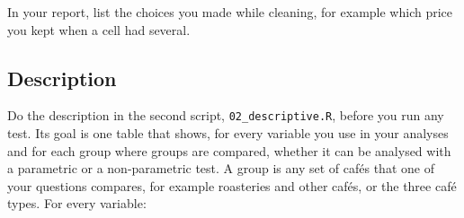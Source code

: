 \documentclass[11pt,a4paper]{article}
\begin{document}
In your report, list the choices you made while cleaning, for example which price you kept when a cell had several.

\subsection{Description}\label{sec:chk-description}

Do the description in the second script, \texttt{02\_descriptive.R}, before you run any test. Its goal is one table that shows, for every variable you use in your analyses and for each group where groups are compared, whether it can be analysed with a parametric or a non-parametric test. A group is any set of caf\'es that one of your questions compares, for example roasteries and other caf\'es, or the three caf\'e types. For every variable:
\end{document}

